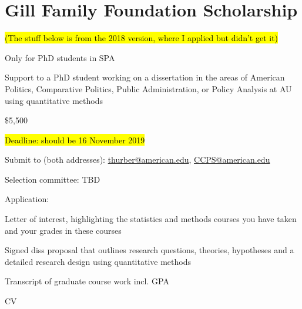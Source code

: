 

\section*{Gill Family Foundation Scholarship}
	\begin{coi}
		\item \hl{(The stuff below is from the 2018 version, where I applied but didn't get it)}
		\item Only for PhD students in SPA
		\item Support to a PhD student working on a dissertation in the areas of American Politics, Comparative Politics, Public Administration, or Policy Analysis at AU using quantitative methods
		\item \$5,500
		\item \hl{Deadline: should be 16 November 2019}
		\item Submit to (both addresses): \href{mailto:thurber@american.edu}{thurber@american.edu}, \href{mailto:CCPS@american.edu}{CCPS@american.edu}
		\item Selection committee: TBD
		\item Application:
			\begin{coi}
				\item Letter of interest, highlighting the statistics and methods courses you have taken and your grades in these courses
				\item Signed diss proposal that outlines research questions, theories, hypotheses and a detailed research design using quantitative methods
				\item Transcript of graduate course work incl. GPA
				\item CV
			\end{coi}
	\end{coi}

